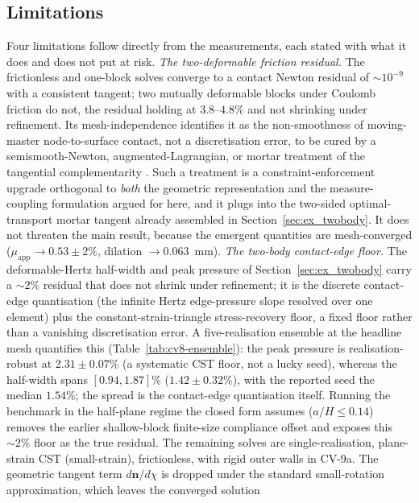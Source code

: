 \documentclass{svjour3}                 %
\newcommand{\nbf}{\bm{n}}
\newcommand{\muapp}{\mu_{\mathrm{app}}}
\begin{document}
\subsection{Limitations}\label{sec:disc:limits}

Four limitations follow directly from the measurements, each stated with what it does and does not put at risk.
\emph{The two-deformable friction residual.} The frictionless and one-block solves converge to a contact Newton
residual of $\sim10^{-9}$ with a consistent tangent; two mutually deformable blocks under Coulomb friction do not,
the residual holding at $3.8$--$4.8\%$ and not shrinking under refinement. Its mesh-independence identifies it as
the non-smoothness of moving-master node-to-surface contact, not a discretisation error, to be cured by a
semismooth-Newton, augmented-Lagrangian, or mortar treatment of the tangential complementarity
\citep{alart1991mixed,simo1992augmented,puso2004mortar,chouly2013nitsche}. Such a treatment is a constraint-enforcement upgrade
orthogonal to \emph{both} the geometric representation and the measure-coupling formulation argued for here, and
it plugs into the two-sided optimal-transport mortar tangent already assembled in
Section~\ref{sec:ex_twobody}. It does not threaten the main result, because the
emergent quantities are mesh-converged ($\muapp\to0.53\pm2\%$, dilation $\to0.063$~mm).
\emph{The two-body contact-edge floor.} The deformable-Hertz half-width and peak pressure of
Section~\ref{sec:ex_twobody} carry a $\sim2\%$ residual that does not shrink under refinement; it is the discrete
contact-edge quantisation (the infinite Hertz edge-pressure slope resolved over one element) plus the
constant-strain-triangle stress-recovery floor, a fixed floor rather than a vanishing discretisation error. A
five-realisation ensemble at the headline mesh quantifies this (Table~\ref{tab:cv8-ensemble}): the peak pressure
is realisation-robust at $2.31\pm0.07\%$ (a systematic CST floor, not a lucky seed), whereas the half-width spans
$[0.94,1.87]\%$ ($1.42\pm0.32\%$), with the reported seed the median $1.54\%$; the spread is the contact-edge
quantisation itself. Running the benchmark in the half-plane regime the closed form assumes ($a/H\le0.14$)
removes the earlier shallow-block finite-size compliance offset and exposes this $\sim2\%$ floor as the true
residual. The remaining solves are single-realisation, plane-strain CST
(small-strain), frictionless, with rigid outer walls in CV-9a. The geometric tangent term
$d\nbf/d\chi$ is dropped under the standard small-rotation approximation, which leaves the converged solution
\end{document}
